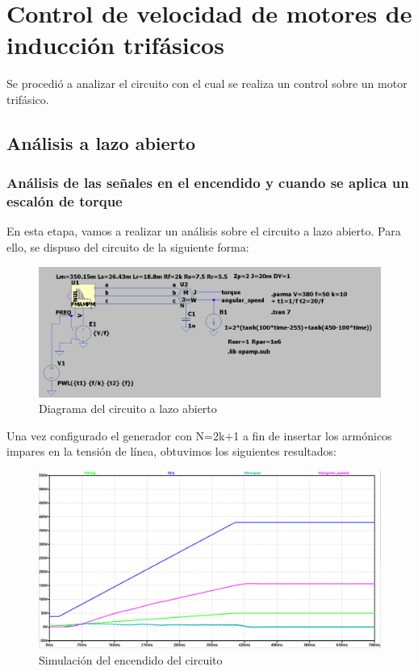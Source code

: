 \documentclass[e4_tp3_main.tex]{subfiles}
\begin{document}

\section{Control de velocidad de motores de inducción trifásicos}
Se procedió a analizar el circuito con el cual se realiza un control sobre un motor trifásico.
\subsection{Análisis a lazo abierto}

\subsubsection{An\'alisis de las señales en el encendido y cuando se aplica un escal\'on de torque}

En esta etapa, vamos a realizar un análisis sobre el circuito a lazo abierto. Para ello, se dispuso del circuito de la siguiente forma:
\begin{figure}[H]
\centering
\includegraphics[width=0.7\linewidth]{Imagenes/3-1-a-circuito.png}
\caption{Diagrama del circuito a lazo abierto}
\end{figure}

Una vez configurado el generador con N=2k+1 a fin de insertar los armónicos impares en la tensión de línea, obtuvimos los siguientes resultados:

\begin{figure}[H]
	\centering
	\includegraphics[width=0.6\linewidth]{Imagenes/3-1-a-inicio.png}
	\caption{Simulaci\'on del encendido del circuito}
	\label{fig:enc}
\end{figure}
\end{document}
